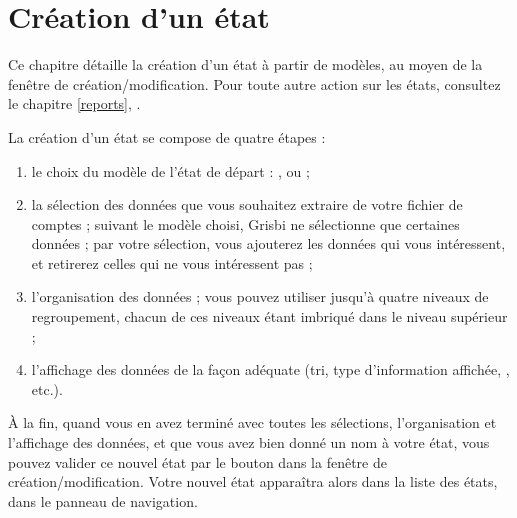 
\chapter{Création d'un état\label{reportscreation}}


Ce chapitre détaille la création d'un état à partir de modèles, au moyen de la  fenêtre de création/modification. Pour toute autre action sur les états, consultez le chapitre \vref{reports}, .

La création d'un état se compose de quatre étapes :

\begin{enumerate}
 \item le choix du modèle de l'état de départ : ,  ou  ; 
 \item la sélection des données que vous souhaitez extraire de votre fichier de comptes ; suivant le modèle choisi, Grisbi ne sélectionne que certaines données ; par votre sélection, vous ajouterez les données qui vous intéressent, et retirerez celles qui ne vous intéressent pas ;
 \item l'organisation des données ; vous pouvez utiliser jusqu'à quatre niveaux de regroupement, chacun de ces niveaux étant imbriqué dans le niveau supérieur ;
 \item l'affichage des données de la façon adéquate (\gls{tri}, type d'information affichée, , etc.).
\end{enumerate}

À la fin, quand vous en avez terminé avec toutes les sélections, l'organisation et l'affichage des données, et que vous avez bien donné un nom à votre état, vous pouvez valider ce nouvel état par le bouton  dans la fenêtre de création/modification. Votre nouvel état apparaîtra alors dans la liste des états, dans le panneau de navigation.


